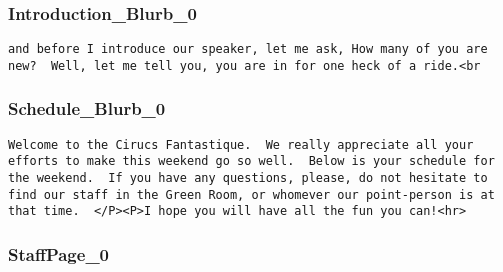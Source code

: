 \documentclass[tablesignature]{scrartcl}
\begin{document}
\subsubsection{Introduction\_{}Blurb\_{}0}
\label{sec-3_5_2}

\begin{verbatim}
and before I introduce our speaker, let me ask, How many of you are
new?  Well, let me tell you, you are in for one heck of a ride.<br
\end{verbatim}
\subsubsection{Schedule\_{}Blurb\_{}0}
\label{sec-3_5_3}

\begin{verbatim}
Welcome to the Cirucs Fantastique.  We really appreciate all your
efforts to make this weekend go so well.  Below is your schedule for
the weekend.  If you have any questions, please, do not hesitate to
find our staff in the Green Room, or whomever our point-person is at
that time.  </P><P>I hope you will have all the fun you can!<hr>
\end{verbatim}
\subsubsection{StaffPage\_{}0}
\label{sec-3_5_4}
\end{document}
